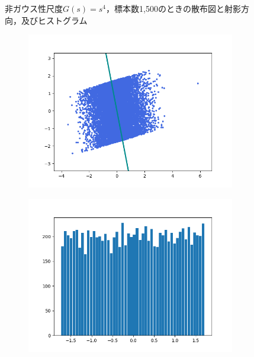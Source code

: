 \documentclass[class=jsarticle, crop=false, dvipdfmx, fleqn]{standalone}
\begin{document}
\begin{figure}
\begin{minipage}{0.45\linewidth}
\begin{figure}[H]
            \label{fig:s4_n1500_hist}
        \end{figure}
    \end{minipage}
    \caption{非ガウス性尺度\(G(s) = s^4\)，標本数1,500のときの散布図と射影方向，及びヒストグラム}
    \label{fig:s4_n1500}
\end{figure}

\begin{figure}
	\centering
    \begin{minipage}{0.45\linewidth}
        \begin{figure}[H]
        	   \centering
            \includegraphics[clip, width=\linewidth]{../figures/assignment2_result_s4_n10000_scatter.png}
            \label{fig:s4_n10000_scatter}
        \end{figure}
    \end{minipage}
    \begin{minipage}{0.45\linewidth}
        \begin{figure}[H]
            \centering
            \includegraphics[clip, width=\linewidth]{../figures/assignment2_result_s4_n10000_hist.png}

\end{figure}
\end{minipage}
\end{figure}
\end{document}
